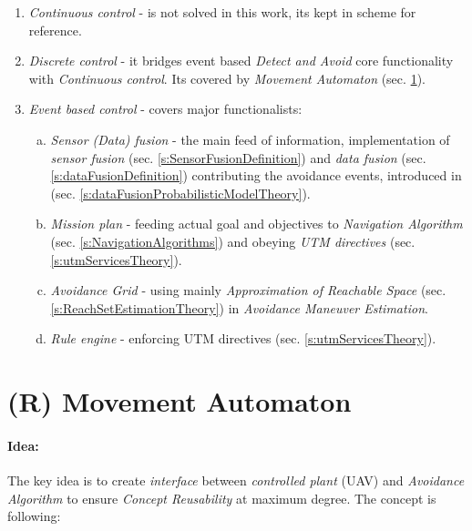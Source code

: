 \begin{enumerate}
    \item \emph{Continuous control} - is not solved in this work, its kept in scheme for reference. 
    
    \item \emph{Discrete control} - it bridges event based \emph{Detect and Avoid} core functionality with \emph{Continuous control}. Its covered by \emph{Movement Automaton} (sec. \ref{s:movementAutomatonTheory}).

	\newpage    
    \item \emph{Event based control} - covers major functionalists:    
    \begin{enumerate}[a.]
        \item \emph{Sensor (Data) fusion} - the main feed of information, implementation of \emph{sensor fusion} (sec. \ref{s:SensorFusionDefinition}) and \emph{data fusion} (sec. \ref{s:dataFusionDefinition}) contributing the avoidance events, introduced in (sec. \ref{s:dataFusionProbabilisticModelTheory}).
        
        \item \emph{Mission plan} - feeding actual goal and objectives to \emph{Navigation Algorithm} (sec. \ref{s:NavigationAlgorithms}) and obeying \emph{UTM directives} (sec. \ref{s:utmServicesTheory}).
        
        \item \emph{Avoidance Grid}  - using mainly \emph{Approximation of Reachable Space} (sec. \ref{s:ReachSetEstimationTheory}) in \emph{Avoidance Maneuver Estimation}.
        
        \item \emph{Rule engine} - enforcing UTM directives (sec. \ref{s:utmServicesTheory}).
    \end{enumerate}
    
\end{enumerate}

\section{(R) Movement Automaton}\label{s:movementAutomatonTheory}

\paragraph{Idea:} The key idea is to create \emph{interface} between \emph{controlled plant} (UAV) and \emph{Avoidance Algorithm} to ensure \emph{Concept Reusability} at maximum degree.  The concept is following:

